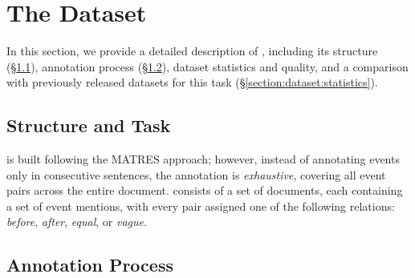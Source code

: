 \section{The \App{} Dataset}
\label{section:dataset}
In this section, we provide a detailed description of \App{}, including its structure (§\ref{section:background:struct}), annotation process (§\ref{section:background:annot-process}), dataset statistics and quality, and a comparison with previously released datasets for this task (§\ref{section:dataset:statistics}).

\subsection{Structure and Task}
\label{section:background:struct}
\App{} is built following the MATRES \cite{ning-etal-2018-multi} approach; however, instead of annotating events only in consecutive sentences, the annotation is \textit{exhaustive}, covering all event pairs across the entire document.
\App{} consists of a set of documents, each containing a set of event mentions, with every pair assigned one of the following relations: \textit{before}, \textit{after}, \textit{equal}, or \textit{vague}.




\subsection{Annotation Process}
\label{section:background:annot-process}

